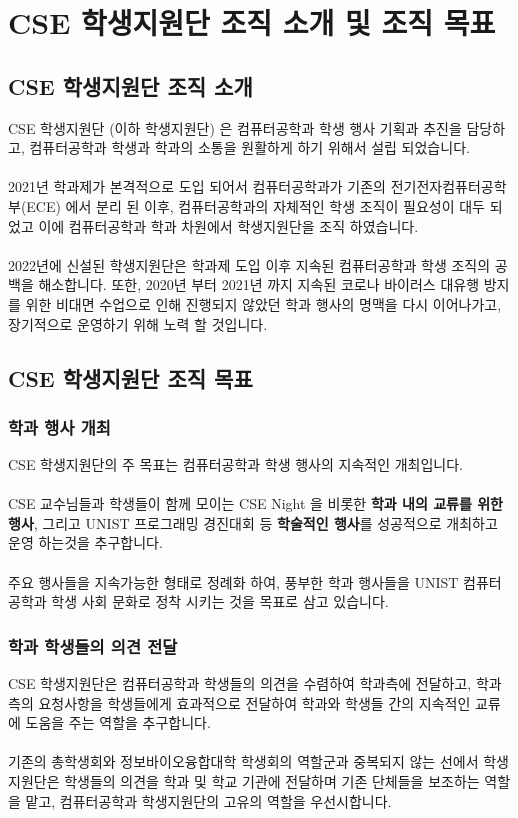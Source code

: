 \newpage
\section{CSE 학생지원단 조직 소개 및 조직 목표}

\subsection{CSE 학생지원단 조직 소개}
CSE 학생지원단 (이하 학생지원단) 은 컴퓨터공학과 학생 행사 기획과 추진을 담당하고, 컴퓨터공학과 학생과 학과의 소통을 원활하게 하기 위해서 설립 되었습니다.\\
\\
2021년 학과제가 본격적으로 도입 되어서 컴퓨터공학과가 기존의 전기전자컴퓨터공학부(ECE) 에서 분리 된 이후, 컴퓨터공학과의 자체적인 학생 조직이 필요성이 대두 되었고 이에 컴퓨터공학과 학과 차원에서 학생지원단을 조직 하였습니다.\\
\\
2022년에 신설된 학생지원단은 학과제 도입 이후 지속된 컴퓨터공학과 학생 조직의 공백을 해소합니다. 또한, 2020년 부터 2021년 까지 지속된 코로나 바이러스 대유행 방지를 위한 비대면 수업으로 인해 진행되지 않았던 학과 행사의 명맥을 다시 이어나가고, 장기적으로 운영하기 위해 노력 할 것입니다.

\subsection{CSE 학생지원단 조직 목표}
\subsubsection{학과 행사 개최}
CSE 학생지원단의 주 목표는 컴퓨터공학과 학생 행사의 지속적인 개최입니다.\\
\\
CSE 교수님들과 학생들이 함께 모이는 CSE Night 을 비롯한 \textbf{학과 내의 교류를 위한 행사}, 그리고 UNIST 프로그래밍 경진대회 등 \textbf{학술적인 행사}를 성공적으로 개최하고 운영 하는것을 추구합니다.\\
\\
주요 행사들을 지속가능한 형태로 정례화 하여, 풍부한 학과 행사들을 UNIST 컴퓨터공학과 학생 사회 문화로 정착 시키는 것을 목표로 삼고 있습니다.
\subsubsection{학과 학생들의 의견 전달}
CSE 학생지원단은 컴퓨터공학과 학생들의 의견을 수렴하여 학과측에 전달하고, 학과측의 요청사항을 학생들에게 효과적으로 전달하여 학과와 학생들 간의 지속적인 교류에 도움을 주는 역할을 추구합니다.\\
\\
기존의 총학생회와 정보바이오융합대학 학생회의 역할군과 중복되지 않는 선에서  학생지원단은 학생들의 의견을 학과 및 학교 기관에 전달하며 기존 단체들을 보조하는 역할을 맡고, 컴퓨터공학과 학생지원단의 고유의 역할을 우선시합니다.





